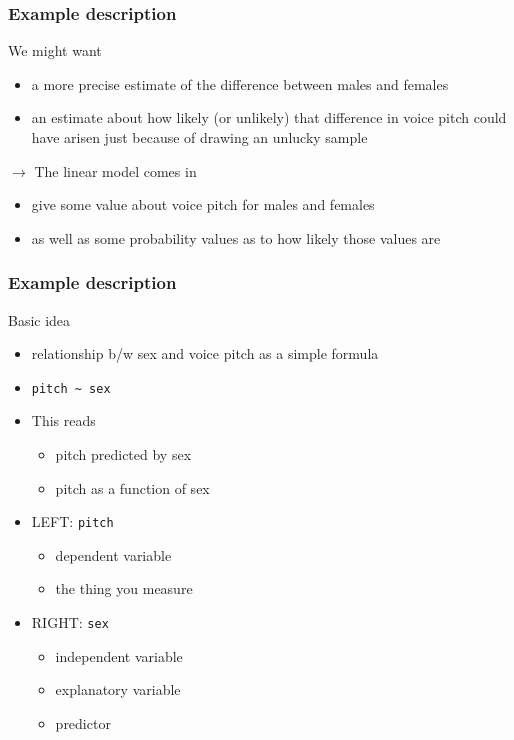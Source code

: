 \documentclass[10p]{beamer}\usepackage[]{graphicx}\usepackage[]{color}
\begin{document}
\begin{frame}
\frametitle{Example description}
We might want
\begin{itemize}
\item a more precise estimate of the difference between males and females
\item an estimate about how likely (or unlikely) that difference in voice pitch could have arisen just because of drawing an unlucky sample
\end{itemize}

$\rightarrow$ \alert{The linear model} comes in
\begin{itemize}
\item give some value about voice pitch for males and females
\item as well as \alert{some probability values} as to how likely those values are
\end{itemize}
\end{frame}

\begin{frame}[fragile]
\frametitle{Example description}
Basic idea
\begin{itemize}
\item relationship b/w sex and voice pitch as a simple formula
\item \verb|pitch ~ sex|
\item This reads
	\begin{itemize}
	\item pitch predicted by sex
	\item pitch as a function of sex
	\end{itemize}
\item LEFT: \texttt{pitch}
	\begin{itemize}
	\item dependent variable
	\item the thing you measure
	\end{itemize}
\item RIGHT: \texttt{sex}
	\begin{itemize}
	\item independent variable
	\item explanatory variable
	\item predictor
	\end{itemize}
\end{itemize}
\end{frame}
\end{document}
